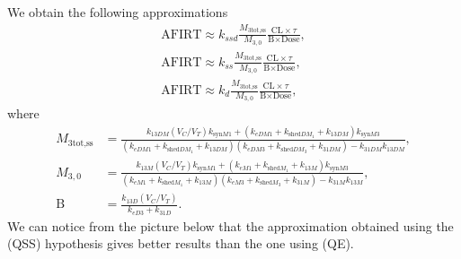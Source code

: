 We obtain the following approximations 
\begin{align*}
\text{AFIRT} \approx k_{ssd}\frac{M_{3\text{tot,ss}}}{M_{3,0}}\frac{\text{CL}\times\tau}{\text{B}\times\text{Dose}},\\
\text{AFIRT} \approx k_{ss}\frac{M_{3\text{tot,ss}}}{M_{3,0}}\frac{\text{CL}\times\tau}{\text{B}\times\text{Dose}},\\
\text{AFIRT} \approx k_{d}\frac{M_{3\text{tot,ss}}}{M_{3,0}}\frac{\text{CL}\times\tau}{\text{B}\times\text{Dose}},
\end{align*}  
where 
\begin{align*}
M_{3\text{tot,ss}}&=\frac{k_{13DM}(V_C/V_T)k_{\text{syn}M1}+(k_{eDM1}+k_{\text{shed}DM_1}+k_{13DM})k_{\text{syn}M3}}{(k_{eDM1}+k_{\text{shed}DM_1}+k_{13DM})(k_{eDM3}+k_{\text{shed}DM_3}+k_{31DM})-k_{31DM}k_{13DM}},\\
M_{3,0}&=\frac{k_{13M}(V_C/V_T)k_{\text{syn}M1}+(k_{eM1}+k_{\text{shed}M_1}+k_{13M})k_{\text{syn}M3}}{(k_{eM1}+k_{\text{shed}M_1}+k_{13M})(k_{eM3}+k_{\text{shed}M_3}+k_{31M})-k_{31M}k_{13M}},\\
\text{B}&=\frac{k_{13D}(V_C/V_T)}{k_{eD3}+k_{31D}}.
\end{align*}
We can notice from the picture below that the approximation obtained using the (QSS) hypothesis gives better results than the one using (QE).

